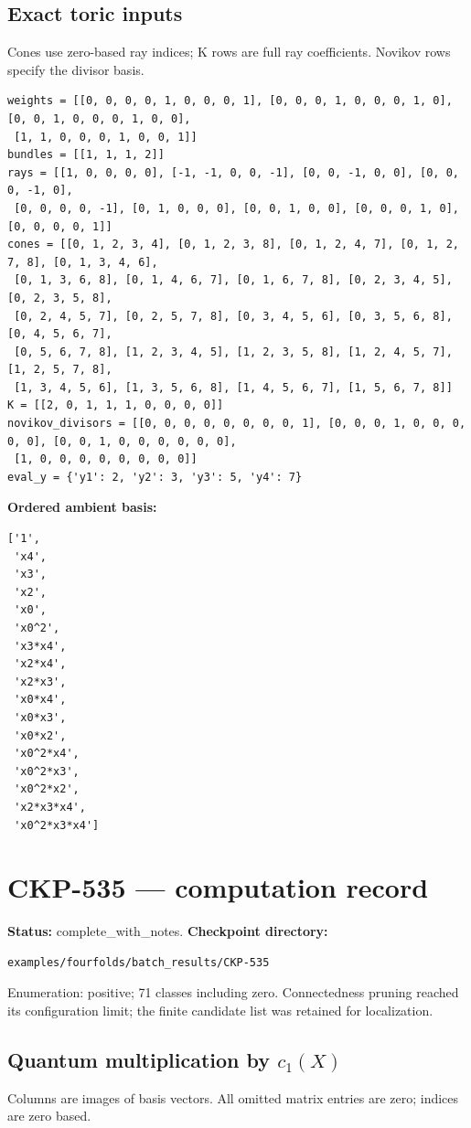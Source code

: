 \documentclass[10pt,a4paper]{article}
\begin{document}
\subsection*{Exact toric inputs}
Cones use zero-based ray indices; K rows are full ray coefficients. Novikov rows specify the divisor basis.

\begin{lstlisting}
weights = [[0, 0, 0, 0, 1, 0, 0, 0, 1], [0, 0, 0, 1, 0, 0, 0, 1, 0], [0, 0, 1, 0, 0, 0, 1, 0, 0],
 [1, 1, 0, 0, 0, 1, 0, 0, 1]]
bundles = [[1, 1, 1, 2]]
rays = [[1, 0, 0, 0, 0], [-1, -1, 0, 0, -1], [0, 0, -1, 0, 0], [0, 0, 0, -1, 0],
 [0, 0, 0, 0, -1], [0, 1, 0, 0, 0], [0, 0, 1, 0, 0], [0, 0, 0, 1, 0], [0, 0, 0, 0, 1]]
cones = [[0, 1, 2, 3, 4], [0, 1, 2, 3, 8], [0, 1, 2, 4, 7], [0, 1, 2, 7, 8], [0, 1, 3, 4, 6],
 [0, 1, 3, 6, 8], [0, 1, 4, 6, 7], [0, 1, 6, 7, 8], [0, 2, 3, 4, 5], [0, 2, 3, 5, 8],
 [0, 2, 4, 5, 7], [0, 2, 5, 7, 8], [0, 3, 4, 5, 6], [0, 3, 5, 6, 8], [0, 4, 5, 6, 7],
 [0, 5, 6, 7, 8], [1, 2, 3, 4, 5], [1, 2, 3, 5, 8], [1, 2, 4, 5, 7], [1, 2, 5, 7, 8],
 [1, 3, 4, 5, 6], [1, 3, 5, 6, 8], [1, 4, 5, 6, 7], [1, 5, 6, 7, 8]]
K = [[2, 0, 1, 1, 1, 0, 0, 0, 0]]
novikov_divisors = [[0, 0, 0, 0, 0, 0, 0, 0, 1], [0, 0, 0, 1, 0, 0, 0, 0, 0], [0, 0, 1, 0, 0, 0, 0, 0, 0],
 [1, 0, 0, 0, 0, 0, 0, 0, 0]]
eval_y = {'y1': 2, 'y2': 3, 'y3': 5, 'y4': 7}
\end{lstlisting}

\textbf{Ordered ambient basis:}
\begin{lstlisting}
['1',
 'x4',
 'x3',
 'x2',
 'x0',
 'x0^2',
 'x3*x4',
 'x2*x4',
 'x2*x3',
 'x0*x4',
 'x0*x3',
 'x0*x2',
 'x0^2*x4',
 'x0^2*x3',
 'x0^2*x2',
 'x2*x3*x4',
 'x0^2*x3*x4']
\end{lstlisting}

\clearpage\section*{CKP-535 --- computation record}
\textbf{Status:} complete\_with\_notes.
\textbf{Checkpoint directory:}
\begin{lstlisting}
examples/fourfolds/batch_results/CKP-535
\end{lstlisting}

Enumeration: positive; 71 classes including zero.
Connectedness pruning reached its configuration limit; the finite candidate list was retained for localization.
\subsection*{Quantum multiplication by $c_1(X)$}
Columns are images of basis vectors. All omitted matrix entries are zero; indices are zero based.
\end{document}
